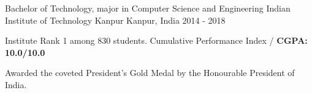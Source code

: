


\begin{cventries}


\cventry
{Bachelor of Technology, major in Computer Science and Engineering} %
{Indian Institute of Technology Kanpur} %
{Kanpur, India} %
{2014 - 2018} %
{%
\begin{cvitems}
\setlength\itemsep{0.1cm}
\item {Institute Rank 1 among 830 students. Cumulative Performance Index /
    \textbf{CGPA: 10.0/10.0}}
\item {Awarded the coveted President's Gold Medal by the Honourable President of India.}
\end{cvitems}
}

\end{cventries}

